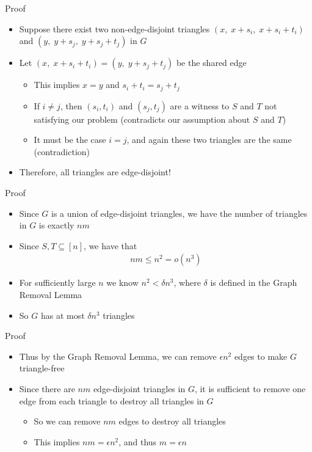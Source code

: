 \begin{frame}{Proof}
\begin{itemize}
	\item Suppose there exist two non-edge-disjoint triangles $(x,\; x+s_i,\; x+s_i+t_i)$ and $(y,\; y+s_j,\; y+s_j + t_j)$ in $G$
	\item<2-> Let $(x,\; x+s_i+t_i) = (y,\; y + s_j + t_j)$ be the shared edge
	\begin{itemize}
		\item<3-> This implies $x = y$ and $s_i + t_i = s_j + t_j$
		\item<4-> If $i \neq j$, then $(s_i, t_i)$ and $(s_j, t_j)$ are a witness to $S$ and $T$ not satisfying our problem (contradicts our assumption about $S$ and $T$)
		\item<5-> It must be the case $i = j$, and again these two triangles are the same (contradiction)
	\end{itemize}
	\item<6-> Therefore, all triangles are edge-disjoint!
\end{itemize}
\end{frame}

\begin{frame}{Proof}
\begin{itemize}
	\item<1-> Since $G$ is a union of edge-disjoint triangles, we have the number of triangles in $G$ is exactly $nm$
	\item<2-> Since $S, T \subseteq [n]$, we have that
	\begin{align*}
	nm \leq n^2 = o(n^3)
	\end{align*}
	\item<3-> For sufficiently large $n$ we know $n^2 < \delta n^3$, where $\delta$ is defined in the Graph Removal Lemma
	\item<4-> So $G$ has at most $\delta n^3$ triangles
\end{itemize}
\end{frame}

\begin{frame}{Proof}
\begin{itemize}
	\item Thus by the Graph Removal Lemma, we can remove $\epsilon n^2$ edges to make $G$ triangle-free
	\item<2-> Since there are $nm$ edge-disjoint triangles in $G$, it is sufficient to remove one edge from each triangle to destroy all triangles in $G$
	\begin{itemize}
		\item<3-> So we can remove $nm$ edges to destroy all triangles
		\item<4-> This implies $nm = \epsilon n^2$, and thus $m = \epsilon n$
	\end{itemize}
\end{itemize}
\end{frame}

